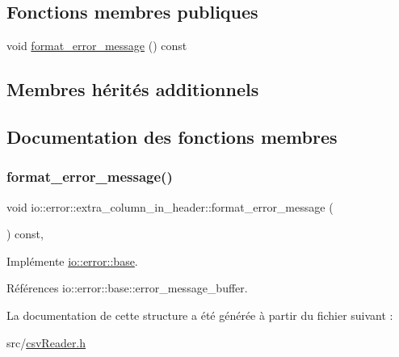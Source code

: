\subsection*{Fonctions membres publiques}
\begin{DoxyCompactItemize}
\item 
void \hyperlink{structio_1_1error_1_1extra__column__in__header_ab7bb962a470c429206c51729fbf114dd}{format\+\_\+error\+\_\+message} () const
\end{DoxyCompactItemize}
\subsection*{Membres hérités additionnels}


\subsection{Documentation des fonctions membres}
\mbox{\label{structio_1_1error_1_1extra__column__in__header_ab7bb962a470c429206c51729fbf114dd}} 
\subsubsection{\texorpdfstring{format\+\_\+error\+\_\+message()}{format\_error\_message()}}
{\footnotesize\ttfamily void io\+::error\+::extra\+\_\+column\+\_\+in\+\_\+header\+::format\+\_\+error\+\_\+message (\begin{DoxyParamCaption}{ }\end{DoxyParamCaption}) const\hspace{0.3cm}{\ttfamily [inline]}, {\ttfamily [virtual]}}



Implémente \hyperlink{structio_1_1error_1_1base_a7d9ff6a31b716a24f056cf8a3e15191d}{io\+::error\+::base}.



Références io\+::error\+::base\+::error\+\_\+message\+\_\+buffer.



La documentation de cette structure a été générée à partir du fichier suivant \+:\begin{DoxyCompactItemize}
\item 
src/\hyperlink{csvReader_8h}{csv\+Reader.\+h}\end{DoxyCompactItemize}
